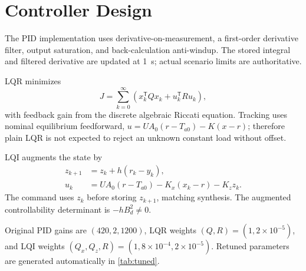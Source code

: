 \section{Controller Design}\label{sec:controllers}
The PID implementation uses derivative-on-measurement, a first-order derivative filter, output saturation, and back-calculation anti-windup. The stored integral and filtered derivative are updated at \SI{1}{s}; actual scenario limits are authoritative.

LQR minimizes
\begin{equation}
J=\sum_{k=0}^{\infty}(x_k^{\mathsf T}Qx_k+u_k^{\mathsf T}Ru_k), \label{eq:lqcost}
\end{equation}
with feedback gain from the discrete algebraic Riccati equation. Tracking uses nominal equilibrium feedforward,
$u=UA_0(r-T_{a0})-K(x-r)$; therefore plain LQR is not expected to reject an unknown constant load without offset.

LQI augments the state by
\begin{align}
z_{k+1}&=z_k+h(r_k-y_k),\nonumber\\
u_k&=UA_0(r-T_{a0})-K_x(x_k-r)-K_z z_k. \label{eq:lqi}
\end{align}
The command uses $z_k$ before storing $z_{k+1}$, matching synthesis. The augmented controllability determinant is $-hB_d^2\ne0$.

Original PID gains are $(420,2,1200)$, LQR weights $(Q,R)=(1,2\times10^{-5})$, and LQI weights $(Q_x,Q_z,R)=(1,8\times10^{-4},2\times10^{-5})$. Retuned parameters are generated automatically in \cref{tab:tuned}.
\begin{table}[!htbp]\centering\caption{Equal-budget parameters: PID $(K_p,K_i,K_d)$, LQR $(Q,R)$, and LQI $(Q_x,Q_z,R)$.}\label{tab:tuned}\resizebox{\linewidth}{!}{}\end{table}

